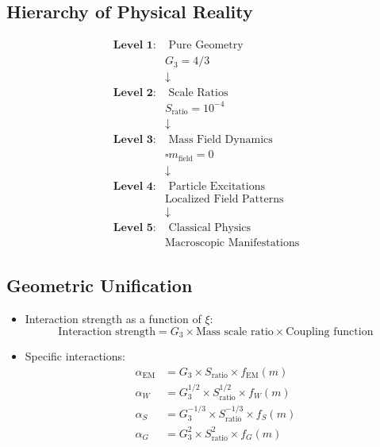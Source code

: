 \documentclass[12pt,a4paper]{article}
\begin{document}
	\subsection{Hierarchy of Physical Reality}
	
	\begin{align}
		\textbf{Level 1:} &\text{ Pure Geometry} \nonumber \\
		&G_3 = 4/3 \nonumber \\
		&\downarrow \nonumber \\
		\textbf{Level 2:} &\text{ Scale Ratios} \nonumber \\
		&S_{\text{ratio}} = 10^{-4} \nonumber \\
		&\downarrow \nonumber \\
		\textbf{Level 3:} &\text{ Mass Field Dynamics} \nonumber \\
		&\square m_{\text{field}} = 0 \nonumber \\
		&\downarrow \nonumber \\
		\textbf{Level 4:} &\text{ Particle Excitations} \nonumber \\
		&\text{Localized Field Patterns} \nonumber \\
		&\downarrow \nonumber \\
		\textbf{Level 5:} &\text{ Classical Physics} \nonumber \\
		&\text{Macroscopic Manifestations} \nonumber
	\end{align}
	
	\subsection{Geometric Unification}
	\begin{itemize}
		\item Interaction strength as a function of $\xi$:
		\begin{equation}
			\text{Interaction strength} = G_3 \times \text{Mass scale ratio} \times \text{Coupling function}
		\end{equation}
		
		\item Specific interactions:
		\begin{align}
			\alpha_{\text{EM}} &= G_3 \times S_{\text{ratio}} \times f_{\text{EM}}(m) \\
			\alpha_W &= G_3^{1/2} \times S_{\text{ratio}}^{1/2} \times f_W(m) \\
			\alpha_S &= G_3^{-1/3} \times S_{\text{ratio}}^{-1/3} \times f_S(m) \\
			\alpha_G &= G_3^2 \times S_{\text{ratio}}^2 \times f_G(m)
		\end{align}
	\end{itemize}
	
\end{document}
